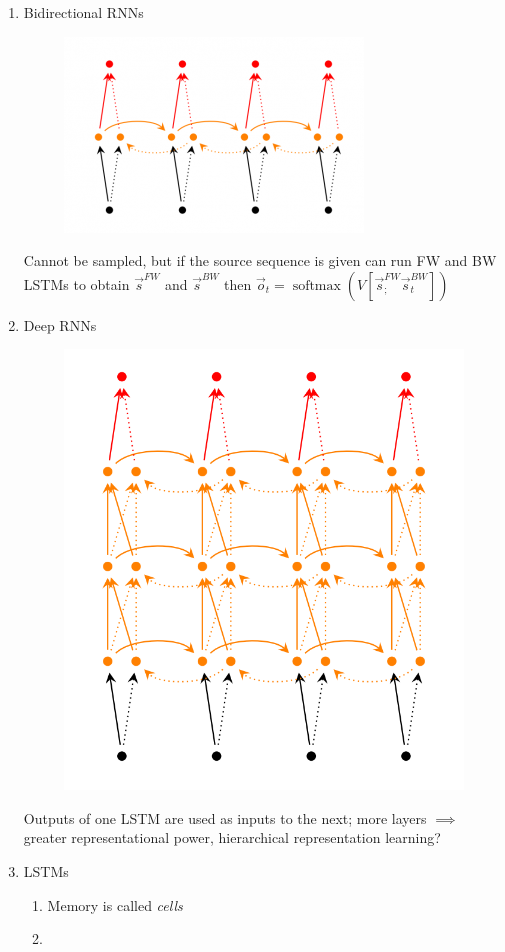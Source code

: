 \documentclass[a4paper,oneside,reqno,onecolumn]{amsart}
\newcommand{\s}{\vec{s}}
\renewcommand{\o}{\vec{o}}
\DeclareMathOperator*{\softmax}{softmax}
\begin{document}
\begin{enumerate}
    \item Bidirectional RNNs
        \begin{figure}[htpb]
            \centering
            \includegraphics[width=0.8\linewidth]{Figures/bi-rnn.png}
            \caption{}
        \end{figure}
        Cannot be sampled, but if the source sequence is given can run FW and BW LSTMs
        to obtain $\s^{FW}$ and $\s^{BW}$ then $\o_t = \softmax(V [\s^{FW}_; \s^{BW}_t])$
    \item Deep RNNs
        \begin{figure}[htpb]
            \centering
            \includegraphics[width=0.8\linewidth]{Figures/deep-rnn.png}
            \caption{}
        \end{figure}
        Outputs of one LSTM are used as inputs to the next; more layers $\implies$
        greater representational power, hierarchical representation learning?
    \item LSTMs
        \begin{enumerate}
            \item Memory is called \emph{cells}
            \item 
        \end{enumerate}
\end{enumerate}
\end{document}
